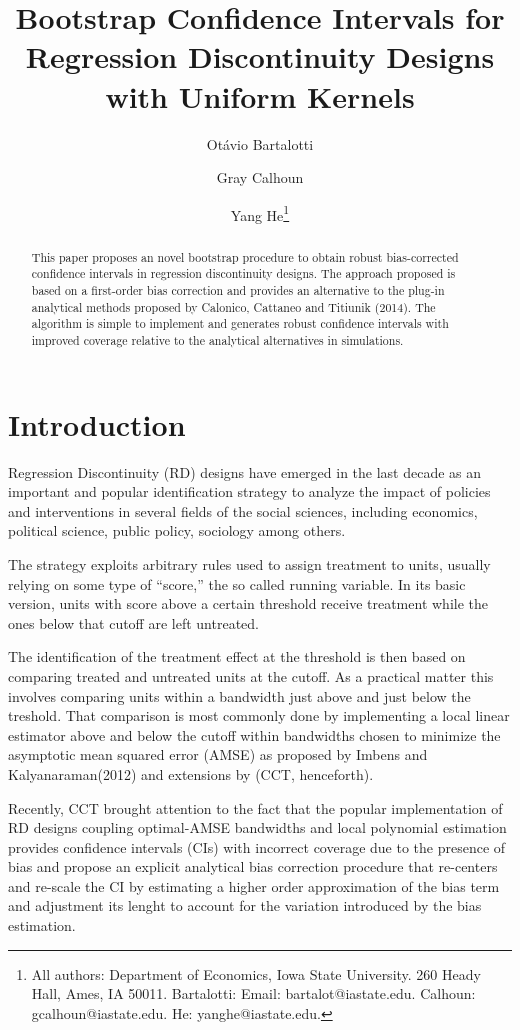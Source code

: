 \documentclass[12pt,fleqn]{article}
\title{Bootstrap Confidence Intervals for Regression Discontinuity Designs with Uniform Kernels}
\author{Ot\'avio Bartalotti \and Gray Calhoun \and Yang He\thanks{All authors: 
Department of Economics, Iowa State University. 260 Heady Hall, Ames, IA  50011.
Bartalotti: Email: bartalot@iastate.edu. Calhoun: gcalhoun@iastate.edu.
He: yanghe@iastate.edu.}}
\begin{document}
\maketitle

\begin{abstract}
This paper proposes an novel bootstrap procedure to obtain robust bias-corrected
confidence intervals in regression discontinuity designs. The approach proposed 
is based on a first-order bias correction and provides an alternative
to the plug-in analytical methods proposed by Calonico, Cattaneo and Titiunik (2014).
The algorithm is simple to implement and generates robust confidence intervals
with improved coverage relative to the analytical alternatives in simulations.
\end{abstract}

\section{Introduction}
Regression Discontinuity (RD) designs have emerged in the last decade as an 
important and popular identification strategy to analyze the impact of policies
and interventions in several fields of the social sciences, including economics,
political science, public policy, sociology among others.

The strategy exploits arbitrary rules used to assign treatment to units, usually
relying on some type of ``score,'' the so called running variable. In its basic 
version, units with score above a certain threshold receive treatment while the 
ones below that cutoff are left untreated.

The identification of the treatment effect at the threshold is then based on 
comparing treated and untreated units at the cutoff. As a practical matter this 
involves comparing units within a bandwidth just above and just below the 
treshold. That comparison is most commonly done by implementing a local linear
estimator above and below the cutoff within bandwidths chosen to minimize the 
asymptotic mean squared error (AMSE) as proposed by Imbens and Kalyanaraman(2012)
and extensions by \cite{calonico2014} (CCT, henceforth).

Recently, CCT brought attention to the fact that the popular implementation of RD designs coupling optimal-AMSE bandwidths
and local polynomial estimation provides confidence intervals (CIs) with
incorrect coverage due to the presence of bias and propose an explicit analytical
bias correction procedure that re-centers and re-scale the CI by estimating a higher 
order approximation of the bias term and adjustment its lenght to account for 
the variation introduced by the bias estimation.
\end{document}
